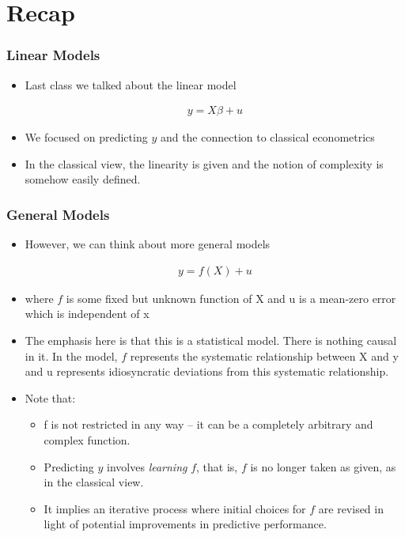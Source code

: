 \documentclass[
  shownotes,
  xcolor={svgnames},
  hyperref={colorlinks,citecolor=DarkBlue,linkcolor=DarkRed,urlcolor=DarkBlue}
  , aspectratio=169]{beamer}
\begin{document}
\section{Recap}
\begin{frame}[fragile]
\frametitle{Linear Models}

\begin{itemize}

 \item Last class we talked about the linear model

    \begin{align}
    y = X \beta + u
    \end{align}
    
\item We focused on predicting $y$ and the connection to classical econometrics
\medskip
\item In the classical view, the linearity is given and the notion of complexity is somehow easily defined.
\end{itemize}

\end{frame}
\begin{frame}[fragile]
\frametitle{General Models}

\begin{itemize}
\item However, we can think about more general models

\begin{align}
    y = f(X)  + u
    \end{align}

\item where $f$ is some fixed but unknown function of X and u is a mean-zero error which is independent of x
\item  The emphasis here is that this is a statistical model. There is nothing causal in it. In the model, $f$ represents the systematic relationship between X and y and u represents idiosyncratic deviations from this systematic relationship.
\medskip
\item  Note that:
\begin{itemize}
  \item f is not restricted in any way – it can be a completely arbitrary and complex function.
  \item  Predicting $y$ involves \emph{learning} $f$, that is, $f$ is no longer taken as given, as in the classical view. 
  \item It implies an iterative process where initial choices for $f$ are revised in light of potential improvements in predictive performance.
\end{itemize}
  
  

\end{itemize}
\end{frame}
\end{document}
